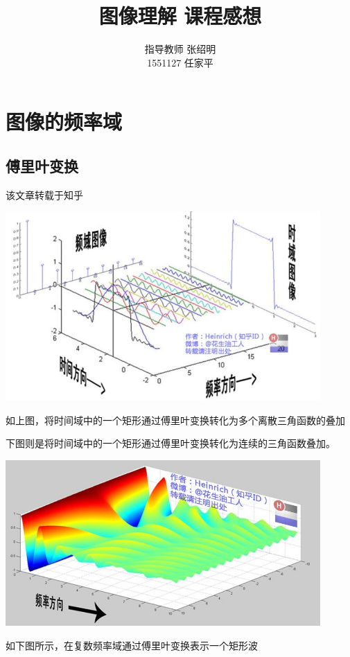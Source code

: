 \documentclass[a4paper,16pt,UTF8]{article}
\begin{document}
    
\title{\Huge 图像理解 课程感想}
\author{指导教师 \quad 张绍明\\
        1551127 \quad 任家平}
\date{}
\maketitle

\section{\LARGE 图像的频率域}

\subsection{\large 傅里叶变换}
该文章转载于知乎

\includegraphics[width = 0.9\textwidth]{1.jpg}

如上图，将时间域中的一个矩形通过傅里叶变换转化为多个离散三角函数的叠加

下图则是将时间域中的一个矩形通过傅里叶变换转化为连续的三角函数叠加。

\includegraphics[width = 0.9\textwidth]{3.jpg}

如下图所示，在复数频率域通过傅里叶变换表示一个矩形波
\end{document}
